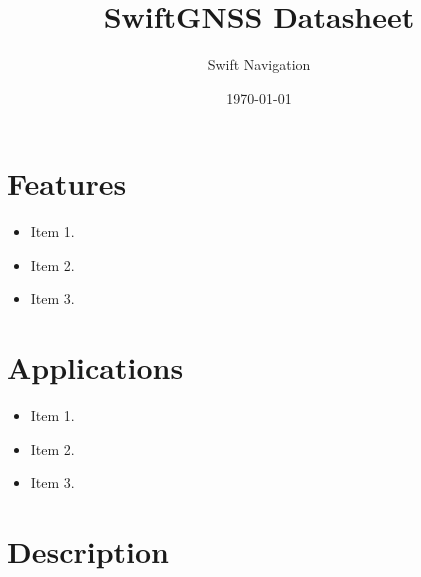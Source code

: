 \documentclass{article}
\title{SwiftGNSS Datasheet}
\author{Swift Navigation}
\date{\today}
\begin{document}
\maketitle


\begin{multicols*}{2}
\raggedcolumns


\section*{Features}
\large
\label{sec:Features}
\begin{itemize}
  \bulletnoindent
  \item Item 1.
  \item Item 2.
  \item Item 3.
\end{itemize}
\normalsize

\section*{Applications}
\large
\label{sec:Applications}
\begin{itemize}
  \bulletnoindent
  \item Item 1.
  \item Item 2.
  \item Item 3.
\end{itemize}
\normalsize

\section*{Description}

\lipsum[1-3]


\end{multicols*}
\end{document}
